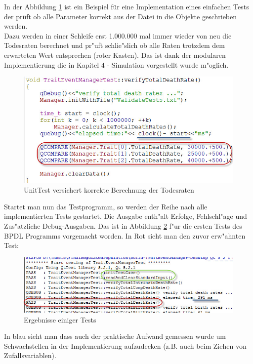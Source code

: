 \documentclass[11pt, a4paper, german]{article}
\theoremstyle{plain}
\begin{document}
	In der Abbildung \ref{Unit Test} ist ein Beispiel für eine Implementation eines einfachen Tests der prüft ob alle Parameter korrekt aus der Datei in die Objekte geschrieben werden.\\
	Dazu werden in einer Schleife erst 1.000.000 mal immer wieder von neu die Todesraten berechnet und pr"uft schlie"slich ob alle Raten trotzdem dem erwarteten Wert entsprechen (roter Kasten). Das ist dank der modularen Implementierung die in Kapitel 4 - Simulation vorgestellt wurde m"oglich.
	\begin{figure}[H]
		\centering
		\includegraphics[width=1 \linewidth]{./Pictures/UnitTest_death}
		\caption[UnitTest]{UnitTest versichert korrekte Berechnung der Todesraten}
		\label{Unit Test}
	\end{figure}
	Startet man nun das Testprogramm, so werden der Reihe nach alle implementierten Tests gestartet. Die Ausgabe enth"alt Erfolge, Fehlschl"age und Zus"atzliche Debug-Ausgaben. Das ist in Abbildung \ref{Test Results} f"ur die ersten Tests des BPDL Programms vorgemacht worden. In Rot sieht man den zuvor erw"ahnten Test:
	\begin{figure}[H]
		\centering
		\includegraphics[width=1 \linewidth]{./Pictures/TestResult_start_death}
		\caption[Test Resultat einer Test Datei]{Ergebnisse einiger Tests}
		\label{Test Results}
	\end{figure}
	In blau sieht man dass auch der praktische Aufwand gemessen wurde um Schwachstellen in der Implementierung aufzudecken (z.B. auch beim Ziehen von Zufallsvariablen).\\
\end{document}
